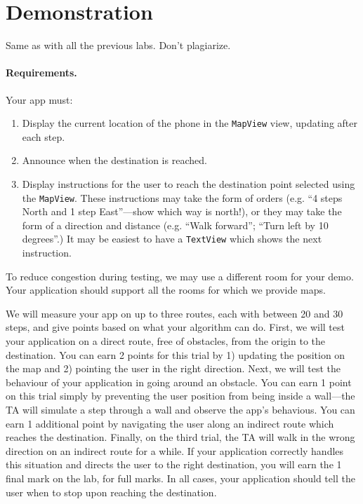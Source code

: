 \documentclass[10pt]{article}
\begin{document}
\section{Demonstration}
Same as with all the previous labs. Don't plagiarize. 
\newpage
\paragraph{Requirements.}
Your app must:
\begin{enumerate}
\item Display the current location of the phone in the {\tt MapView} view, updating after each step.
\item Announce when the destination is reached.
\item Display instructions for the user to reach the destination point selected using the {\tt MapView}. These instructions may take the form of orders (e.g. ``4 steps North and 1 step East''---show which way is north!), or they may take the form of a direction and distance (e.g. ``Walk forward''; ``Turn left by 10 degrees''.) It may be easiest to have a {\tt TextView} which shows the next instruction.
\end{enumerate}
To reduce congestion during testing, we may use a different room for your demo. Your application should support all the rooms for which we provide maps.

We will measure your app on up to three routes, each with between 20 and 30 steps, and give points based on what your algorithm can do. First, we will test your application on a direct route, free of obstacles, from the origin to the destination. You can earn 2 points for this trial by 1) updating the position on the map and 2) pointing the user in the right direction. Next, we will test the behaviour of your application in going around an obstacle. You can earn 1 point on this trial simply by preventing the user position from being inside a wall---the TA will simulate a step through a wall and observe the app's behavious. You can earn 1 additional point by navigating the user along an indirect route which reaches the destination. Finally, on the third trial, the TA will walk in the wrong direction on an indirect route for a while. If your application correctly handles this situation and directs the user to the right destination, you will earn the 1 final mark on the lab, for full marks. In all cases, your application should tell the user when to stop upon reaching the destination.

\end{document}
